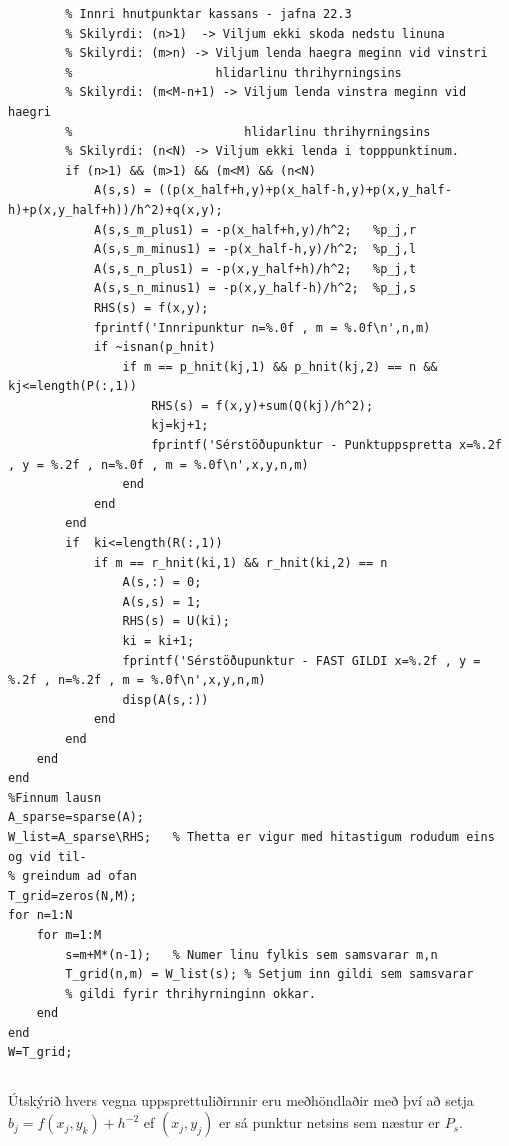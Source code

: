 \documentclass[11pt,a4paper,titlepage]{article}
\begin{document}
\begin{verbatim}
        % Innri hnutpunktar kassans - jafna 22.3
        % Skilyrdi: (n>1)  -> Viljum ekki skoda nedstu linuna
        % Skilyrdi: (m>n) -> Viljum lenda haegra meginn vid vinstri
        %                    hlidarlinu thrihyrningsins
        % Skilyrdi: (m<M-n+1) -> Viljum lenda vinstra meginn vid haegri
        %                        hlidarlinu thrihyrningsins
        % Skilyrdi: (n<N) -> Viljum ekki lenda i topppunktinum.
        if (n>1) && (m>1) && (m<M) && (n<N)
            A(s,s) = ((p(x_half+h,y)+p(x_half-h,y)+p(x,y_half-h)+p(x,y_half+h))/h^2)+q(x,y);
            A(s,s_m_plus1) = -p(x_half+h,y)/h^2;   %p_j,r
            A(s,s_m_minus1) = -p(x_half-h,y)/h^2;  %p_j,l
            A(s,s_n_plus1) = -p(x,y_half+h)/h^2;   %p_j,t
            A(s,s_n_minus1) = -p(x,y_half-h)/h^2;  %p_j,s
            RHS(s) = f(x,y);
            fprintf('Innripunktur n=%.0f , m = %.0f\n',n,m)
            if ~isnan(p_hnit)
                if m == p_hnit(kj,1) && p_hnit(kj,2) == n && kj<=length(P(:,1))
                    RHS(s) = f(x,y)+sum(Q(kj)/h^2);
                    kj=kj+1;
                    fprintf('Sérstöðupunktur - Punktuppspretta x=%.2f , y = %.2f , n=%.0f , m = %.0f\n',x,y,n,m)
                end
            end
        end
        if  ki<=length(R(:,1))
            if m == r_hnit(ki,1) && r_hnit(ki,2) == n 
                A(s,:) = 0;
                A(s,s) = 1;
                RHS(s) = U(ki);
                ki = ki+1;
                fprintf('Sérstöðupunktur - FAST GILDI x=%.2f , y = %.2f , n=%.2f , m = %.0f\n',x,y,n,m)
                disp(A(s,:))
            end
        end
    end
end
%Finnum lausn
A_sparse=sparse(A);
W_list=A_sparse\RHS;   % Thetta er vigur med hitastigum rodudum eins og vid til-
% greindum ad ofan
T_grid=zeros(N,M);
for n=1:N
    for m=1:M
        s=m+M*(n-1);   % Numer linu fylkis sem samsvarar m,n
        T_grid(n,m) = W_list(s); % Setjum inn gildi sem samsvarar
        % gildi fyrir thrihyrninginn okkar.
    end
end
W=T_grid;

\end{verbatim}
\subsection{}
Útskýrið hvers vegna uppsprettuliðirnnir eru meðhöndlaðir með því að setja $b_{j} = f(x_{j},y_{k})+h^{-2}$ ef $(x_{j},y_{j})$ er sá punktur netsins sem næstur er $P_s$.  
\end{document}
